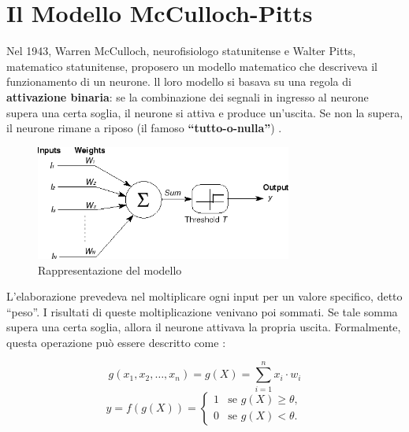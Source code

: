 

\section{Il Modello McCulloch-Pitts}
Nel 1943, Warren McCulloch, neurofisiologo statunitense e Walter Pitts, matematico statunitense, 
proposero un modello matematico che descriveva il funzionamento di un neurone.
ll loro modello si basava su una regola di \textbf{attivazione binaria}: se la combinazione 
dei segnali in ingresso al neurone supera una certa soglia, il neurone si attiva e 
produce un’uscita. Se non la supera, il neurone rimane a 
riposo (il famoso \textbf{“tutto-o-nulla”}) \cite{STORIA_PERCETTONE, 
IMAMGINE_MODELLO_MAT_NEURONE_GENERALE_PERCETTONE, MODELLO_E_FUNZIONAMNETO_REURONE_BIOLOGICO}.

\begin{figure}[H]
    \centering
    \includegraphics[width=0.75\textwidth]{Immagini/Generiche/PercettroneBinario.png}
    \caption{Rappresentazione del modello \cite{IMAMGINE_MODELLO_MAT_NEURONE_GENERALE_PERCETTONE}}
    \label{fig:modelloNeurone}
\end{figure}

L’elaborazione prevedeva nel moltiplicare ogni input per un valore specifico, detto “peso”. 
I risultati di queste moltiplicazione venivano poi sommati. 
Se tale somma supera una certa soglia, allora il neurone attivava la 
propria uscita. Formalmente, questa operazione può essere descritto come
\cite{MODELLO_E_FUNZIONAMNETO_REURONE_BIOLOGICO}:

\begin{equation}
    g(x_1, x_2,\dots,x_n) = g(X) = \sum_{i=1}^{n}x_i \cdot w_i
\end{equation}
\begin{equation}
    y = f(g(X)) =
    \begin{cases} 
    1 & \text{se } g(X) \ge \theta, \\ 
    0 & \text{se } g(X) < \theta.
    \end{cases}
\end{equation}

